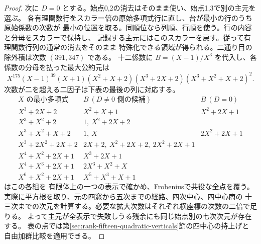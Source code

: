 \begin{proof}
次に $D=0$ とする。始点0,2の消去はそのまま使い、始点1,3で別の主元を選ぶ。
各有理関数行をスカラー倍の原始多項式行に直し、台が最小の行のうち原始係数の次数が
最小の位置を取る。同順位なら列順、行順を使う。行の内容と分母をスカラーで保持し、
記録する主元にはこのスカラーを戻す。従って有理関数行列の通常の消去をそのまま
特殊化できる領域が得られる。二通り目の除外積は次数 $(391,347)$ である。
十二係数に $B=(X-1)/X^3$ を代入し、各係数の分母を払った最大公約元は
\[
 X^{175}(X-1)^{39}(X+1)(X^2+X+2)(X^3+2X+2)(X^3+X^2+X+2)^2 .
\]
次数が二を超える二因子は下表の最後の列に対応する。
\[
\begin{array}{c|l|l}
 X\text{ の最小多項式}&B\ (D\ne0\text{ 側の候補})&B\ (D=0)\\ \hline
 X^3+2X+2 & X^2+X+1 & X^2+2X+1\\
 X^3+X^2+2 & 1,\ X^2+2X+2 & \\
 X^3+X^2+X+2 & 1,\ X & 2X^2+2X+1\\
 X^3+2X^2+2X+2 & 2X+2,\ X^2+2X+2,\ 2X^2+2X+1 & \\
 X^4+X^2+2X+1 & X^3+2X+1 & \\
 X^4+X^3+2X+1 & 2X^3+X^2+X & \\
 X^6+X^2+2X+1 & X^5+X^3+X+1 &
\end{array}
\]
 はこの各組を
有限体上の一つの表示で確かめ、Frobeniusで共役な全点を覆う。
実際に平方根を取り、元の四窓から五次までの経路、四次中心、四中心商の
十三次までの次元を計算する。必要な拡大次数はそれぞれ横座標の次数の二倍で足りる。
よって主元が全表示で失敗しうる残余にも同じ始点別の七次次元が存在する。
表の点では第\ref{sec:rank-fifteen-quadratic-verticals}節の四中心の持上げと
自由加群比較を適用できる。
\end{proof}
